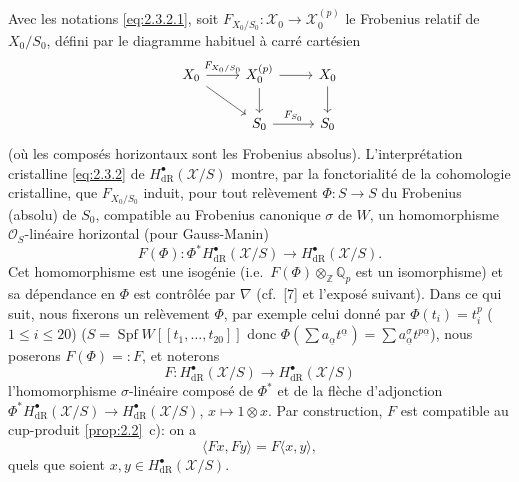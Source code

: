 \documentclass[12pt,a4paper]{article}
\theoremstyle{plain}
\theoremstyle{definition}
\theoremstyle{remark}
\DeclareMathOperator{\Spf}{Spf}
\begin{document}
\subsection{}

Avec les notations \eqref{eq:2.3.2.1}, soit $F_{X_0/S_0}: \mathcal{X}_0 \to \mathcal{X}_0^{(p)}$ le Frobenius relatif de $X_0/S_0$, défini par le diagramme habituel à carré cartésien
\begin{equation}\label{eq:2.5.1}
\begin{tikzcd}
X_0 \arrow[r, "F_{X_0/S_0}"] \arrow[dr] & X_0^{(p)} \arrow[r] \arrow[d] & X_0 \arrow[d] \\
& S_0 \arrow[r, "F_{S_0}"] & S_0
\end{tikzcd}
\end{equation}
(où les composés horizontaux sont les Frobenius absolus). L'interprétation cristalline \eqref{eq:2.3.2} de $H^{\bullet}_{\mathrm{dR}}(\mathcal{X}/S)$ montre, par la fonctorialité de la cohomologie cristalline, que $F_{X_0/S_0}$ induit, pour tout relèvement $\Phi: S \to S$ du Frobenius (absolu) de $S_0$, compatible au Frobenius canonique $\sigma$ de $W$, un homomorphisme $\mathcal{O}_S$-linéaire horizontal (pour Gauss-Manin)
\begin{equation}\label{eq:2.5.2}
F(\Phi): \Phi^* H^{\bullet}_{\mathrm{dR}}(\mathcal{X}/S) \to H^{\bullet}_{\mathrm{dR}}(\mathcal{X}/S).
\end{equation}
Cet homomorphisme est une isogénie (i.e.~$F(\Phi) \otimes_{\mathbb{Z}} \mathbb{Q}_p$ est un isomorphisme) et sa dépendance en $\Phi$ est contrôlée par $\nabla$ (cf.~[7] et l'exposé suivant). Dans ce qui suit, nous fixerons un relèvement $\Phi$, par exemple celui donné par $\Phi(t_i) = t_i^p$ ($1 \leqslant i \leqslant 20$) ($S = \Spf W[[t_1, \ldots, t_{20}]]$ donc $\Phi(\sum a_{\underline{\alpha}} t^{\underline{\alpha}}) = \sum a^{\sigma}_{\underline{\alpha}} t^{p\underline{\alpha}}$), nous poserons $F(\Phi) =: F$, et noterons
\begin{equation}\label{eq:2.5.3}
F: H^{\bullet}_{\mathrm{dR}}(\mathcal{X}/S) \to H^{\bullet}_{\mathrm{dR}}(\mathcal{X}/S)
\end{equation}
l'homomorphisme $\sigma$-linéaire composé de $\Phi^*$ et de la flèche d'adjonction $\Phi^* H^{\bullet}_{\mathrm{dR}}(\mathcal{X}/S) \to H^{\bullet}_{\mathrm{dR}}(\mathcal{X}/S)$, $x \mapsto 1 \otimes x$. Par construction, $F$ est compatible au cup-produit \ref{prop:2.2}~c): on a
\begin{equation}\label{eq:2.5.4}
\langle Fx, Fy \rangle = F\langle x, y \rangle,
\end{equation}
quels que soient $x, y \in H^{\bullet}_{\mathrm{dR}}(\mathcal{X}/S)$.
\end{document}
